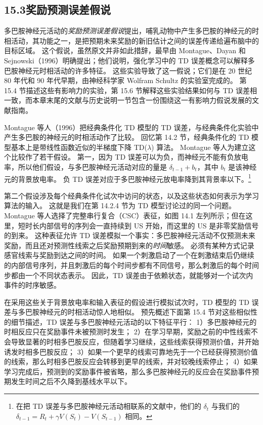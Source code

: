 \documentclass[UTF8, 12pt, fontset=fandol, oneside]{ctexart}
\begin{document}
\subsection*{15.3\quad 奖励预测误差假说}

多巴胺神经元活动的\emph{奖励预测误差假说}提出，哺乳动物中产生多巴胺的神经元的时相活动，其功能之一，是把预期未来奖励的新旧估计之间的误差传递给遍布脑中的目标区域。
这个假说，虽然原文并非如此措辞，最早由 Montague、Dayan 和 Sejnowski（1996）明确提出；他们说明，强化学习中的 TD 误差概念可以解释多巴胺神经元时相活动的许多特征。
这些实验导致了这一假说；它们是在 20 世纪 80 年代和 90 年代早期，由神经科学家 Wolfram Schultz 的实验室完成的。
第 15.4 节描述这些有影响力的实验，第 15.6 节解释这些实验结果如何与 TD 误差相一致，而本章末尾的文献与历史说明一节包含一份围绕这一有影响力假说发展的文献指南。

Montague 等人（1996）把经典条件化 TD 模型的 TD 误差，与经典条件化实验中产生多巴胺的神经元的时相活动作了比较。
回忆第 14.2 节，经典条件化的 TD 模型基本上是带线性函数近似的半梯度下降 TD($\lambda$) 算法。
Montague 等人为建立这个比较作了若干假设。
第一，因为 TD 误差可以为负，而神经元不能有负放电率，所以他们假设，与多巴胺神经元活动对应的量是 $\delta_{t-1}+b_t$，其中 $b_t$ 是该神经元的背景放电率。
负 TD 误差对应于多巴胺神经元放电率降到其背景率以下。\footnote{在把 TD 误差与多巴胺神经元活动相联系的文献中，他们的 $\delta_t$ 与我们的 $\delta_{t-1}=R_t+\gamma V(S_t)-V(S_{t-1})$ 相同。}

第二个假设涉及每个经典条件化试次中访问的状态，以及这些状态如何表示为学习算法的输入。
这就是我们在第 14.2.4 节为 TD 模型讨论过的同一个问题。
Montague 等人选择了完整串行复合（CSC）表征，如图 14.1 左列所示；但在这里，短时长内部信号的序列会一直持续到 US 开始，而这里的 US 是非零奖励信号的到来。
这种表征允许 TD 误差模拟一个事实：多巴胺神经元活动不仅预测未来奖励，而且还对预测性线索之后奖励预期到来的\emph{时间}敏感。
必须有某种方式记录感官线索与奖励到达之间的时间。
如果一个刺激启动了一个在刺激结束后仍继续的内部信号序列，并且刺激后的每个时间步都有不同信号，那么刺激后的每个时间步都由一个不同状态表示。
因此，TD 误差由于依赖状态，就能够对一个试次内事件的时序敏感。

在采用这些关于背景放电率和输入表征的假设进行模拟试次时，TD 模型的 TD 误差与多巴胺神经元的时相活动惊人地相似。
预先概述下面第 15.4 节对这些相似性的细节描述，TD 误差与多巴胺神经元活动的以下特征平行：
1）多巴胺神经元的时相反应只在奖励事件未被预测时发生；
2）在学习早期，奖励之前的中性线索不会导致显著的时相多巴胺反应，但随着学习继续，这些线索获得预测价值，并开始诱发时相多巴胺反应；
3）如果一个更早的线索可靠地先于一个已经获得预测价值的线索，那么时相多巴胺反应会转移到更早的线索，并对较晚线索停止；
4）如果学习完成后，预测到的奖励事件被省略，那么多巴胺神经元的反应会在奖励事件预期发生时间之后不久降到基线水平以下。
\end{document}
